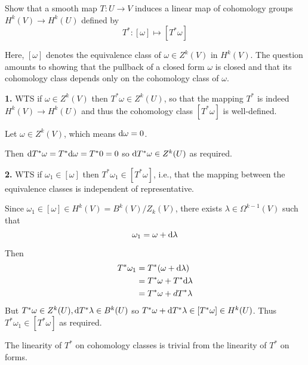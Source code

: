 \documentclass[a4paper, 12pt]{article}
\begin{document}
\begin{problem} 
Show that a smooth map $T: U \to V$ induces a linear map of cohomology groups $H^k (V) \to H^k (U)$ defined by \[
 T^*: [\omega] \mapsto [T^* \omega]
 \]

Here, $[\omega]$ denotes the equivalence class of $\omega \in Z^k (V)$ in $H^k(V)$. The question amounts to showing that the pullback of a closed form $\omega$ is closed and that its cohomology class depends only on the cohomology class of $\omega$.
\end{problem}
\begin{solution}
    \textbf{1.} WTS if $\omega \in Z^k(V)$ then $T^* \omega \in Z^k(U)$, so that the mapping $T^*$ is indeed $H^k(V) \to H^k(U)$ and thus the cohomology class $[T^* \omega]$ is well-defined.

    Let $\omega \in Z^k(V)$, which means $\mathrm{d} \omega = 0$.

    Then $\mathrm{d} T^* \omega = T^* \mathrm{d} \omega = T^* 0 = 0$ so $\mathrm{d} T^* \omega \in Z^k(U)$ as required.

    \textbf{2.} WTS if $\omega_1 \in [\omega]$ then $T^* \omega_1 \in [T^* \omega]$, i.e., that the mapping between the equivalence classes is independent of representative.

    Since $\omega_1 \in [\omega] \in H^k(V) = B^k(V)/Z_k(V)$, there exists $\lambda \in \Omega^{k-1} (V)$ such that \begin{equation*}
    \omega_1 = \omega + \mathrm{d} \lambda
    \end{equation*}

    Then \begin{align*}
        T^* \omega_1 &= T^* (\omega + \mathrm{d} \lambda) \\
        &= T^* \omega + T^* \mathrm{d} \lambda \\
        &= T^* \omega + d T^* \lambda
    \end{align*}
    But $T^* \omega \in Z^k(U), \mathrm{d} T^* \lambda \in B^k(U)$ so $T^* \omega + \mathrm{d} T^* \lambda \in [T^* \omega] \in H^k(U)$. Thus $T^* \omega_1 \in [T^* \omega]$ as required.
    
    The linearity of $T^*$ on cohomology classes is trivial from the linearity of $T^*$ on forms.
\end{solution}
\end{document}
